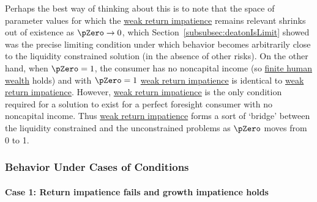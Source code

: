 \documentclass[\econtexRoot/BufferStockTheory]{subfiles}
\begin{document}
Perhaps the best way of thinking about this is to note that the space of parameter values for which the \hyperlink{WRIC}{weak return impatience}  remains relevant shrinks out of existence as $\pZero \rightarrow 0$, which Section~\ref{subsubsec:deatonIsLimit} showed was the precise limiting condition under which behavior becomes arbitrarily close to the liquidity constrained solution (in the absence of other risks).
On the other hand, when $\pZero = 1$, the consumer has no noncapital income (so \hyperlink{FHWC}{finite human wealth} holds) and with $\pZero=1$ \hyperlink{WRIC}{weak return impatience} is identical to \hyperlink{WRIC}{weak return impatience}.
However, \hyperlink{WRIC}{weak return impatience} is the only condition required for a solution to exist for a perfect foresight consumer with no noncapital income.
Thus \hyperlink{WRIC}{weak return impatience} forms a sort of `bridge' between the liquidity constrained and the unconstrained problems as $\pZero$ moves from 0 to 1.

\subsubsection{Behavior Under Cases of Conditions}\label{subsubsec:casesUC}\label{sec:discussConvergence}%

\hypertarget{IntuitionRIC}{}
\paragraph{Case 1: Return impatience fails and growth impatience holds}\label{subsubsec:WhenTheRICFails}
\end{document}
